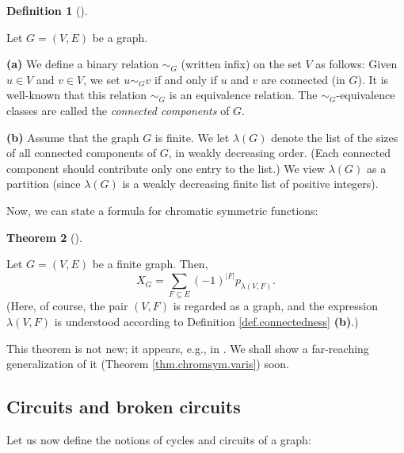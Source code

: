 \documentclass[numbers=enddot,12pt,final,onecolumn,notitlepage]{scrartcl}%
\theoremstyle{definition}
\newtheorem{theo}{Theorem}[section]
\newenvironment{theorem}[1][]
{\begin{theo}[#1]\begin{leftbar}}
{\end{leftbar}\end{theo}}
\newtheorem{defi}[theo]{Definition}
\newenvironment{definition}[1][]
{\begin{defi}[#1]\begin{leftbar}}
{\end{leftbar}\end{defi}}
\let\sumnonlimits\sum
\renewcommand{\sum}{\sumnonlimits\limits}
\begin{document}
\begin{definition}
\label{def.connectedness}Let $G=\left(  V,E\right)  $ be a graph.

\textbf{(a)} We define a binary relation $\sim_{G}$ (written infix) on the set
$V$ as follows: Given $u\in V$ and $v\in V$, we set $u\sim_{G}v$ if and only
if $u$ and $v$ are connected (in $G$). It is well-known that this relation
$\sim_{G}$ is an equivalence relation. The $\sim_{G}$-equivalence classes are
called the \textit{connected components} of $G$.

\textbf{(b)} Assume that the graph $G$ is finite. We let $\lambda\left(
G\right)  $ denote the list of the sizes of all connected components of $G$,
in weakly decreasing order. (Each connected component should contribute only
one entry to the list.) We view $\lambda\left(  G\right)  $ as a partition
(since $\lambda\left(  G\right)  $ is a weakly decreasing finite list of
positive integers).
\end{definition}

Now, we can state a formula for chromatic symmetric functions:

\begin{theorem}
\label{thm.chromsym.empty}Let $G=\left(  V,E\right)  $ be a finite graph.
Then,%
\[
X_{G}=\sum_{F\subseteq E}\left(  -1\right)  ^{\left\vert F\right\vert
}p_{\lambda\left(  V,F\right)  }.
\]
(Here, of course, the pair $\left(  V,F\right)  $ is regarded as a graph, and
the expression $\lambda\left(  V,F\right)  $ is understood according to
Definition \ref{def.connectedness} \textbf{(b)}.)
\end{theorem}

This theorem is not new; it appears, e.g., in \cite[Theorem 2.5]%
{Stanley-chsym}. We shall show a far-reaching generalization of it (Theorem
\ref{thm.chromsym.varis}) soon.

\subsection{Circuits and broken circuits}

Let us now define the notions of cycles and circuits of a graph:
\end{document}
